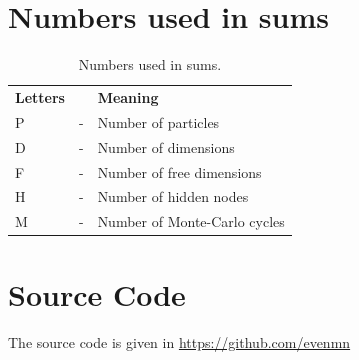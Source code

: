 \section*{Numbers used in sums}
\begin{table}[H]
	\centering
	\begin{tabular}{lcl}
		\textbf{Letters} & & \textbf{Meaning} \\
		P & - & Number of particles \\
		D & - & Number of dimensions \\
		F & - & Number of free dimensions \\
		H & - & Number of hidden nodes \\
		M & - & Number of Monte-Carlo cycles \\
		
	\end{tabular}
	\caption{Numbers used in sums.}
	\label{tab:symbols2}
\end{table}
\thispagestyle{empty}
\clearpage

\section*{Source Code}
    The source code is given in \url{https://github.com/evenmn}

\thispagestyle{empty}
\clearpage
